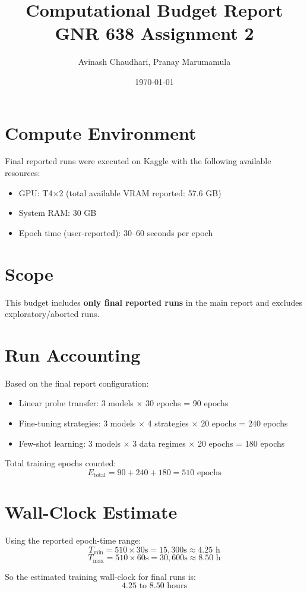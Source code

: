 \documentclass[11pt,a4paper]{article}
\title{Computational Budget Report\\
\large GNR 638 Assignment 2}
\author{Avinash Chaudhari, Pranay Marumamula}
\date{\today}
\begin{document}
\maketitle

\section{Compute Environment}
Final reported runs were executed on Kaggle with the following available resources:
\begin{itemize}
    \item GPU: T4$\times$2 (total available VRAM reported: 57.6 GB)
    \item System RAM: 30 GB
    \item Epoch time (user-reported): 30--60 seconds per epoch
\end{itemize}

\section{Scope}
This budget includes \textbf{only final reported runs} in the main report and excludes exploratory/aborted runs.

\section{Run Accounting}
Based on the final report configuration:
\begin{itemize}
    \item Linear probe transfer: 3 models $\times$ 30 epochs = 90 epochs
    \item Fine-tuning strategies: 3 models $\times$ 4 strategies $\times$ 20 epochs = 240 epochs
    \item Few-shot learning: 3 models $\times$ 3 data regimes $\times$ 20 epochs = 180 epochs
\end{itemize}

Total training epochs counted:
\[
E_{\text{total}} = 90 + 240 + 180 = 510 \text{ epochs}
\]

\section{Wall-Clock Estimate}
Using the reported epoch-time range:
\[
T_{\text{min}} = 510 \times 30\text{s} = 15{,}300\text{s} \approx 4.25\text{ h}
\]
\[
T_{\text{max}} = 510 \times 60\text{s} = 30{,}600\text{s} \approx 8.50\text{ h}
\]

So the estimated training wall-clock for final runs is:
\[
\boxed{4.25\text{ to }8.50\text{ hours}}
\]
\end{document}
